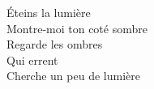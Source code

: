 Éteins la lumière \\
Montre-moi ton coté sombre \\
Regarde les ombres \\
Qui errent \\
Cherche un peu de lumière \\

